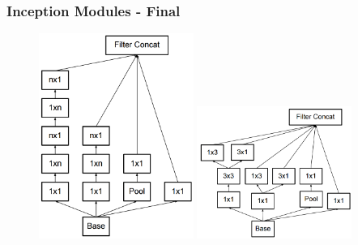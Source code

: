 \documentclass[9pt]{beamer}
\begin{document}
\begin{frame}
	\frametitle{Inception Modules - Final}
	\begin{figure}
		\includegraphics[width=0.45\textwidth]{./figures/edit/breakdown_02.png}
		\hspace{0.05\textwidth} 
		\includegraphics[width=0.45\textwidth]{./figures/edit/breakdown_coarse.png}		
	\end{figure}
\end{frame}
\end{document}
